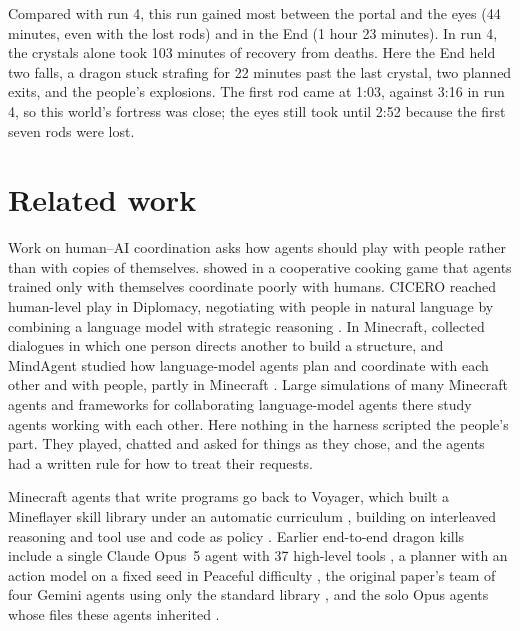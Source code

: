 \documentclass[11pt,a4paper]{article}
\begin{document}
Compared with run 4, this run gained most between the portal and the eyes (44 minutes, even with the lost rods) and in the End (1 hour 23 minutes). In run 4, the crystals alone took 103 minutes of recovery from deaths. Here the End held two falls, a dragon stuck strafing for 22 minutes past the last crystal, two planned exits, and the people's explosions. The first rod came at 1:03, against 3:16 in run 4, so this world's fortress was close; the eyes still took until 2:52 because the first seven rods were lost.

\section{Related work}

Work on human--AI coordination asks how agents should play with people rather than with copies of themselves. \citet{carroll2019} showed in a cooperative cooking game that agents trained only with themselves coordinate poorly with humans. CICERO reached human-level play in Diplomacy, negotiating with people in natural language by combining a language model with strategic reasoning \citep{fair2022cicero}. In Minecraft, \citet{narayanchen2019} collected dialogues in which one person directs another to build a structure, and MindAgent studied how language-model agents plan and coordinate with each other and with people, partly in Minecraft \citep{gong2024mindagent}. Large simulations of many Minecraft agents \citep{altera2024sid} and frameworks for collaborating language-model agents there \citep{white2025collaborating} study agents working with each other. Here nothing in the harness scripted the people's part. They played, chatted and asked for things as they chose, and the agents had a written rule for how to treat their requests.

Minecraft agents that write programs go back to Voyager, which built a Mineflayer skill library under an automatic curriculum \citep{wang2024voyager}, building on interleaved reasoning and tool use \citep{yao2023react} and code as policy \citep{liang2023code}. Earlier end-to-end dragon kills include a single Claude Opus~5 agent with 37 high-level tools \citep{aibengineering2026}, a planner with an action model on a fixed seed in Peaceful difficulty \citep{malde2026astra}, the original paper's team of four Gemini agents using only the standard library \citep{faldor2026team}, and the solo Opus agents whose files these agents inherited \citep{batsuk2026single,batsuk2026second,batsuk2026fourth}.
\end{document}
